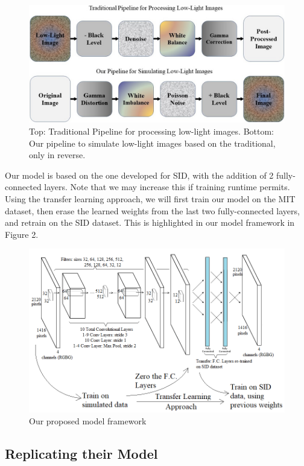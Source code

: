 \documentclass{article}
\begin{document}
\begin{figure}[ht]
  \centering
  \includegraphics[scale=0.35]{pipeline.jpg}
  \caption{Top: Traditional Pipeline for processing low-light images. Bottom: Our  pipeline to simulate low-light images based on the traditional, only in reverse.}
\end{figure}

Our model is based on the one developed for SID, with the addition of 2 fully-connected layers. Note that we may increase this if training runtime permits. Using the transfer learning approach, we will first train our model on the MIT dataset, then erase the learned weights from the last two fully-connected layers, and retrain on the SID dataset. This is highlighted in our model framework in Figure 2. 

\begin{figure}[ht]
  \centering
  \includegraphics[scale=0.5]{model.png}
  \caption{Our proposed model framework}
\end{figure}

\subsection{Replicating their Model}
\end{document}
